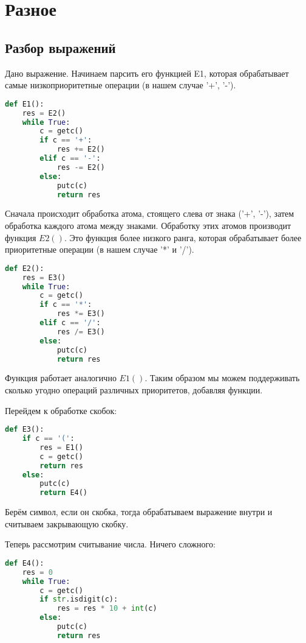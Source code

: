 \chapter{Разное}
\section{Разбор выражений}
Дано выражение. Начинаем парсить его функцией E1, которая обрабатывает самые низкоприоритетные операции (в нашем случае '+', '-').
\begin{lstlisting}[language=Python]
def E1():
	res = E2()
	while True:
		c = getc()
		if c == '+':
			res += E2()
		elif c == '-':
			res -= E2()
		else:
			putc(c)
			return res
\end{lstlisting}
Сначала происходит обработка атома, стоящего слева от знака ('+', '-'), затем обработка каждого атома между знаками. Обработку этих атомов производит функция $E2()$. Это функция более низкого ранга, которая обрабатывает более приоритетные операции (в нашем случае '*' и '/').
\begin{lstlisting}[language=Python]
def E2():
	res = E3()
	while True:
		c = getc()
		if c == '*':
			res *= E3()
		elif c == '/':
			res /= E3()
		else:
			putc(c)
			return res
\end{lstlisting}
Функция работает аналогично $E1()$. Таким образом мы можем поддерживать сколько угодно операций различных приоритетов, добавляя функции.

Перейдем к обработке скобок:
\begin{lstlisting}[language=Python]
def E3():
	if c == '(':
		res = E1()
		c = getc()
		return res
	else:
		putc(c)
		return E4()
\end{lstlisting}
Берём символ, если он скобка, тогда обрабатываем выражение внутри и считываем закрывающую скобку.

Теперь рассмотрим считывание числа. Ничего сложного:
\begin{lstlisting}[language=Python]
def E4():
	res = 0
	while True:
		c = getc()
		if str.isdigit(c):
			res = res * 10 + int(c)
		else:
			putc(c)
			return res
\end{lstlisting}